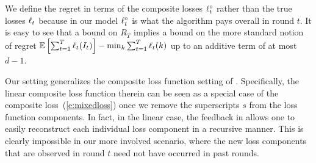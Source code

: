 We define the regret in terms of the composite losses $\ell^{\circ}_t$ rather than the true losses $\ell_t$ because in our model $\ell^{\circ}_t$ is what the algorithm pays overall in round $t$. It is easy to see that a bound on $R_T$ implies a bound on the more standard notion of regret $\mathbb{E}\left[\sum_{t=1}^T \ell_t(I_t)\right] - \min_{k}\sum_{t=1}^T \ell_t(k)$ up to an additive term of at most $d-1$.

Our setting generalizes the composite loss function setting of \citet{ddkp14}.
Specifically, the linear composite loss function therein can be seen as a
special case of the composite loss~(\ref{e:mixedloss}) once we remove
the superscripts $s$ from the loss function components. In fact, in the linear case,
the feedback in \citep{ddkp14} allows one to easily reconstruct each individual
loss component in a recursive manner. This is clearly impossible in our more
involved scenario, where the new loss components that are observed in round $t$ need
not have occurred in past rounds.
